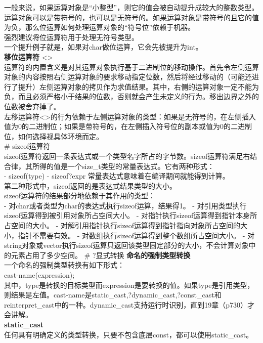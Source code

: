 \documentclass[
  a4paper,
  oneside,tablecaptionabove
]{scrbook}
\begin{document}
一般来说，如果运算对象是\enquote{小整型}，则它的值会被自动提升成较大的整数类型。运算对象可以是带符号的，也可以是无符号的。如果运算对象是带符号的且它的值为负，那么位运算如何处理运算对象的\enquote{符号位}依赖于机器。\\
强烈建议将位运算符用于处理无符号类型。\\
一个提升例子就是，如果对char做位运算，它会先被提升为int。\\
\textbf{移位运算符} \textless{}\textgreater{}\\
运算符的内置含义是对其运算对象执行基于二进制位的移动操作。首先令左侧运算对象的内容按照右侧运算对象的要求移动指定位数，然后将经过移动的（可能还进行了提升）左侧运算对象的拷贝作为求值结果。其中，右侧的运算对象一定不能为负，而且必须严格小于结果的位数，否则就会产生未定义的行为。移出边界之外的位数被舍弃掉了。\\
左移运算符\textless{}\textgreater{}的行为依赖于左侧运算对象的类型：如果是无符号的，在左侧插入值为0的二进制位；如果是带符号的，在左侧插入符号位的副本或值为0的二进制位，如何选择视具体环境而定。\\
\# sizeof运算符\\
sizeof运算符返回一条表达式或一个类型名字所占的字节数。sizeof运算符满足右结合律，其所得的值是一个size\_t类型的常量表达式。它有两种形式：\\
- sizeof(type) - sizeof?expr 常量表达式意味着在编译期间就能得到计算。\\
第二种形式中，sizeof返回的是表达式结果类型的大小。\\
sizeof运算符的结果部分地依赖于其作用的类型：\\
- 对char或者类型为char的表达式执行sizeof运算，结果得1。 -
对引用类型执行sizeof运算得到被引用对象所占空间大小。 -
对指针执行sizeof运算得到指针本身所占空间的大小。 -
对解引用指针执行sizeof运算得到指针指向对象所占空间的大小，指针不需要有效。
- 对数组执行sizeof运算得到整个数组所占空间大小。 -
对string对象或vector执行sizeof运算只返回该类型固定部分的大小，不会计算对象中的元素占用了多少空间。
\# ?显式转换 \textbf{命名的强制类型转换}\\
一个命名的强制类型转换有如下形式：\\
cast-name(expression);\\
其中，type是转换的目标类型而expression是要转换的值。如果type是引用类型，则结果是左值。cast-name是static\_cast,?dynamic\_cast,?const\_cast和reinterpret\_cast中的一种。dynamic\_cast支持运行时识别，直到19章（p730）才会讲解。\\
\textbf{static\_cast}\\
任何具有明确定义的类型转换，只要不包含底层const，都可以使用static\_cast。
\end{document}
